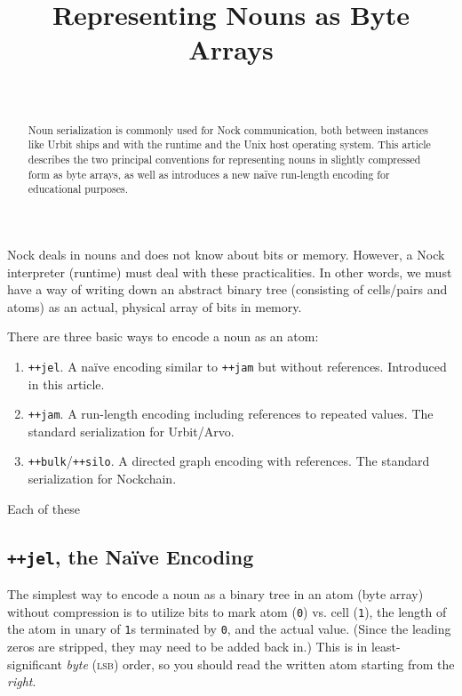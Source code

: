 \documentclass[twoside]{article}
\title{Representing Nouns as Byte Arrays}
\author{\authorname~\authorpatp \\ \affiliation}
\date{}
\begin{document}
\maketitle
\thispagestyle{firststyle}

\begin{abstract}
  Noun serialization is commonly used for Nock communication, both between instances like Urbit ships and with the runtime and the Unix host operating system.  This article describes the two principal conventions for representing nouns in slightly compressed form as byte arrays, as well as introduces a new na\"ive run-length encoding for educational purposes.
\end{abstract}

\setcounter{page}{1}

\tableofcontents

Nock deals in nouns and does not know about bits or memory.  However, a Nock interpreter (runtime) must deal with these practicalities.  In other words, we must have a way of writing down an abstract binary tree (consisting of cells/pairs and atoms) as an actual, physical array of bits in memory.

There are three basic ways to encode a noun as an atom:

\begin{enumerate}
  \item  \texttt{++jel}.  A na\"{i}ve encoding similar to \texttt{++jam} but without references.  Introduced in this article.
  \item  \texttt{++jam}.  A run-length encoding including references to repeated values.  The standard serialization for Urbit/Arvo.
  \item  \texttt{++bulk}/\texttt{++silo}.  A directed graph encoding with references.  The standard serialization for Nockchain.
\end{enumerate}

\noindent{}
Each of these

\subsection{\texttt{++jel}, the Na\"{i}ve Encoding}

The simplest way to encode a noun as a binary tree in an atom (byte array) without compression is to utilize bits to mark atom (\texttt{0}) vs. cell (\texttt{1}), the length of the atom in unary of \texttt{1}s terminated by \texttt{0}, and the actual value.  (Since the leading zeros are stripped, they may need to be added back in.)  This is in least-significant \emph{byte} (\textsc{lsb}) order, so you should read the written atom starting from the \emph{right}.
\end{document}
